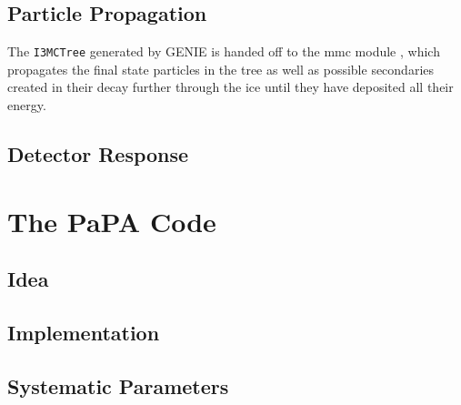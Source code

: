 \subsection{Particle Propagation}
\label{sec:MC_clsim}

The \texttt{I3MCTree} generated by GENIE is handed off to the mmc module
\cite{mmc}, which propagates the final state particles in the tree as well as
possible secondaries created in their decay further through the ice until they
have deposited all their energy. 

\subsection{Detector Response}
\label{sec:MC_detector}

\section{The PaPA Code}
\label{sec:papa}

\subsection{Idea}
\label{sec:sim_idea}


\subsection{Implementation}
\label{sec:papa_code}


\subsection{Systematic Parameters}
\label{sec:systematics}
